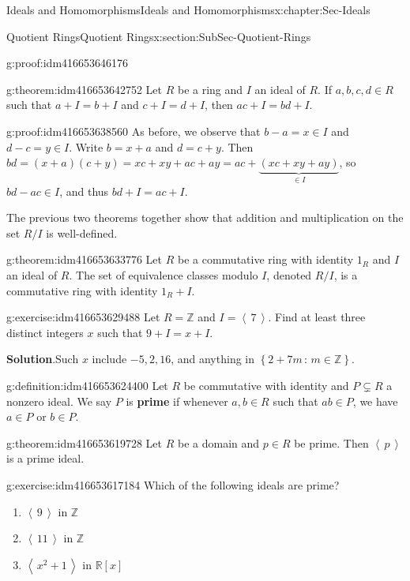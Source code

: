 \documentclass[oneside,10pt,]{book}
\newcommand{\terminology}[1]{\textbf{#1}}
\numberwithin{equation}{section}
\newcommand{\ideal}[1]{\left\langle\, #1 \,\right\rangle}
\newcommand{\setof}[2]{{\left\{#1\,\colon\,#2\right\}}}
\def\Z{{\mathbb Z}}
\def\R{{\mathbb R}}
\begin{document}
\begin{chapterptx}{Ideals and Homomorphisms}{}{Ideals and Homomorphisms}{}{}{x:chapter:Sec-Ideals}
\begin{sectionptx}{Quotient Rings}{}{Quotient Rings}{}{}{x:section:SubSec-Quotient-Rings}
\begin{proofptx}{}{g:proof:idm416653646176}
\end{proofptx}
\begin{theorem}{}{}{g:theorem:idm416653642752}%
Let \(R\) be a ring and \(I\) an ideal of \(R\). If \(a,b,c,d\in R\) such that \(a+I = b+I\) and \(c+I = d+I\), then \(ac + I = bd + I\).%
\end{theorem}
\begin{proofptx}{}{g:proof:idm416653638560}
As before, we observe that \(b-a = x\in I\) and \(d-c = y\in I\). Write \(b = x+a\) and \(d = c+y\). Then \(bd = (x+a)(c+y) = xc + xy + ac + ay = ac + \underbrace{(xc+xy+ay)}_{\in I}\), so \(bd - ac \in I\), and thus \(bd + I = ac + I\).%
\end{proofptx}
The previous two theorems together show that addition and multiplication on the set \(R/I\) is well-defined.%
\begin{theorem}{}{}{g:theorem:idm416653633776}%
Let \(R\) be a commutative ring with identity \(1_R\) and \(I\) an ideal of \(R\). The set of equivalence classes modulo \(I\), denoted \(R/I\), is a commutative ring with identity \(1_R + I\).%
\end{theorem}
\begin{inlineexercise}{}{g:exercise:idm416653629488}%
Let \(R = \Z\) and \(I = \ideal{7}\). Find at least three distinct integers \(x\) such that \(9 + I = x + I\).%
\par\smallskip%
\noindent\textbf{Solution}.\hypertarget{g:solution:idm416653626672}{}\quad{}Such \(x\) include \(-5, 2, 16\), and anything in \(\setof{2+7m}{m\in\Z}\).%
\end{inlineexercise}
\begin{definition}{}{g:definition:idm416653624400}%
Let \(R\) be commutative with identity and \(P\subsetneq R\) a nonzero ideal. We say \(P\) is \terminology{prime} if whenever \(a,b\in R\) such that \(ab\in P\), we have \(a\in P\) or \(b\in P\).%
\end{definition}
\begin{theorem}{}{}{g:theorem:idm416653619728}%
Let \(R\) be a domain and \(p\in R\) be prime. Then \(\ideal{p}\) is a prime ideal.%
\end{theorem}
\begin{inlineexercise}{}{g:exercise:idm416653617184}%
Which of the following ideals are prime?%
\begin{enumerate}
\item{}\(\ideal{9}\) in \(\Z\)%
\item{}\(\ideal{11}\) in \(\Z\)%
\item{}\(\ideal{x^2+1}\) in \(\R[x]\)%

\end{enumerate}
\end{inlineexercise}
\end{sectionptx}
\end{chapterptx}
\end{document}
